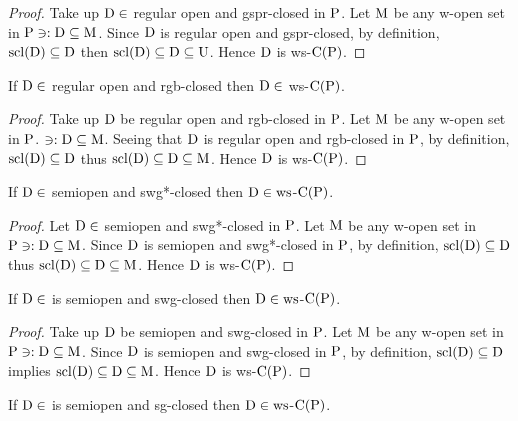 \begin{proof}
Take up $\mathrm{D}\in$ regular open and gspr-closed in $\mathrm{P}$. Let $\mathrm{M}$ be any w-open set in $\mathrm{P}\ni: \mathrm{D}\subseteq \mathrm{M}$. Since $\mathrm{D}$ is regular open and gspr-closed, by definition, $\mathrm{scl}(\mathrm{D})\subseteq \mathrm{D}$ then $\mathrm{scl}(\mathrm{D})\subseteq \mathrm{D}\subseteq \mathrm{U}$. Hence $\mathrm{D}$ is ws-$\mathrm{C}(\mathrm{P})$.
\end{proof}

\begin{thm}\label{thm2.2.36}
If $\mathrm{D}\in$ regular open and rgb-closed then $\mathrm{D}\in$ ws-$\mathrm{C}(\mathrm{P})$.
\end{thm}

\begin{proof}
Take up $\mathrm{D}$ be regular open and rgb-closed in $\mathrm{P}$. Let $\mathrm{M}$ be any w-open set in $\mathrm{P}$. $\ni: \mathrm{D}\subseteq \mathrm{M}$. Seeing that $\mathrm{D}$ is regular open and rgb-closed in $\mathrm{P}$, by definition, $\mathrm{scl}(\mathrm{D})\subseteq \mathrm{D}$ thus $\mathrm{scl}(\mathrm{D})\subseteq \mathrm{D}\subseteq \mathrm{M}$. Hence $\mathrm{D}$ is ws-$\mathrm{C}(\mathrm{P})$.
\end{proof}

\begin{thm}\label{thm2.2.37}
If $\mathrm{D}\in$ semiopen and swg*-closed then $\mathrm{D}\in\mathrm{ws}$-$\mathrm{C}(\mathrm{P})$.
\end{thm}

\begin{proof}
Let $\mathrm{D}\in$ semiopen and swg*-closed in $\mathrm{P}$. Let $\mathrm{M}$ be any w-open set in $\mathrm{P} \ni: \mathrm{D}\subseteq \mathrm{M}$. Since $\mathrm{D}$ is semiopen and swg*-closed in $\mathrm{P}$, by definition, $\mathrm{scl}(\mathrm{D})\subseteq \mathrm{D}$ thus $\mathrm{scl}(\mathrm{D})\subseteq \mathrm{D}\subseteq \mathrm{M}$. Hence $\mathrm{D}$ is ws-$\mathrm{C}(\mathrm{P})$.
\end{proof}

\begin{thm}\label{thm2.2.38}
If $\mathrm{D}\in$ is semiopen and swg-closed then $\mathrm{D}\in\mathrm{ws}$-$\mathrm{C}(\mathrm{P})$.
\end{thm}

\begin{proof}
Take up $\mathrm{D}$ be semiopen and swg-closed in $\mathrm{P}$. Let $\mathrm{M}$ be any w-open set in $\mathrm{P}\ni : \mathrm{D}\subseteq \mathrm{M}$. Since $\mathrm{D}$ is semiopen and swg-closed in $\mathrm{P}$, by definition, $\mathrm{scl}(\mathrm{D})\subseteq \mathrm{D}$ implies $\mathrm{scl}(\mathrm{D})\subseteq \mathrm{D}\subseteq \mathrm{M}$. Hence $\mathrm{D}$ is ws-$\mathrm{C}(\mathrm{P})$.
\end{proof}

\begin{thm}\label{2.2.39}
If $\mathrm{D}\in$ is semiopen and sg-closed then $\mathrm{D}\in\mathrm{ws}$-$\mathrm{C}(\mathrm{P})$.
\end{thm}

